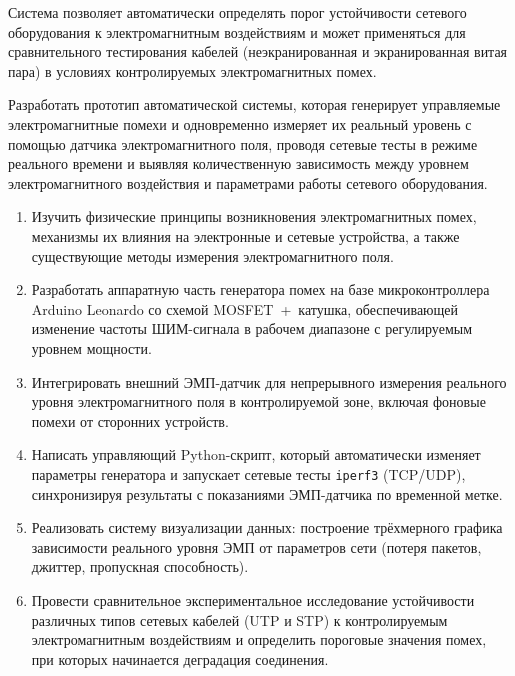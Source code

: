 Система позволяет автоматически определять порог устойчивости
сетевого оборудования к электромагнитным воздействиям
и может применяться для сравнительного тестирования кабелей
(неэкранированная и экранированная витая пара)
в условиях контролируемых электромагнитных помех.


Разработать прототип автоматической системы,
которая генерирует управляемые электромагнитные помехи
и одновременно измеряет их реальный уровень с помощью датчика электромагнитного поля,
проводя сетевые тесты в режиме реального времени
и выявляя количественную зависимость между уровнем электромагнитного
воздействия и параметрами работы сетевого оборудования.


\begin{enumerate}

  \item Изучить физические принципы возникновения
    электромагнитных помех, механизмы их влияния на
    электронные и сетевые устройства, а также существующие
    методы измерения электромагнитного поля.

  \item Разработать аппаратную часть генератора помех
    на базе микроконтроллера Arduino Leonardo со схемой MOSFET~+~катушка,
    обеспечивающей изменение частоты ШИМ-сигнала
    в рабочем диапазоне с регулируемым уровнем мощности.

  \item Интегрировать внешний ЭМП-датчик для непрерывного
    измерения реального уровня электромагнитного поля
    в контролируемой зоне, включая фоновые помехи
    от сторонних устройств.

  \item Написать управляющий Python-скрипт,
    который автоматически изменяет параметры генератора
    и запускает сетевые тесты \texttt{iperf3} (TCP/UDP),
    синхронизируя результаты с показаниями
    ЭМП-датчика по временной метке.

  \item Реализовать систему визуализации данных:
    построение трёхмерного графика зависимости
    реального уровня ЭМП от параметров сети
    (потеря пакетов, джиттер, пропускная способность).

  \item Провести сравнительное экспериментальное исследование
    устойчивости различных типов сетевых кабелей (UTP и STP)
    к контролируемым электромагнитным воздействиям и определить
    пороговые значения помех, при которых начинается деградация соединения.

\end{enumerate}

